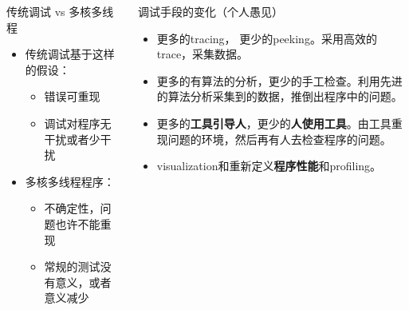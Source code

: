 \documentclass[cjk]{beamer}  %
\begin{document}
\begin{CJK}{UTF8}{gbsn}
{  \begin{columns}
    \column{5cm}
    \begin{overprint}
      \begin{block}{传统调试 vs 多核多线程}
        \begin{itemize}
        \item 传统调试基于这样的假设：
          \begin{itemize}
          \item 错误可重现
          \item 调试对程序无干扰或者少干扰
          \end{itemize}
        \item 多核多线程程序：
          \begin{itemize}
          \item 不确定性，问题也许不能重现
          \item 常规的测试没有意义，或者意义减少
          \end{itemize}
        \end{itemize}
      \end{block}
    \end{overprint}

    \column{6.5cm}
    \begin{overprint}
    \begin{block}{调试手段的变化（个人愚见）}
      \begin{itemize}
      \item 更多的tracing， 更少的peeking。采用高效的trace，采集数据。
      \item 更多的有算法的分析，更少的手工检查。利用先进的算法分析采集到的数据，推倒出程序中的问题。
      \item 更多的\textbf{工具引导人}，更少的\textbf{人使用工具}。由工具重现问题的环境，然后再有人去检查程序的问题。
      \item visualization和重新定义\textbf{程序性能}和profiling。
      \end{itemize}
    \end{block}

    \end{overprint}
  \end{columns}
}


\end{CJK}
\end{document}
